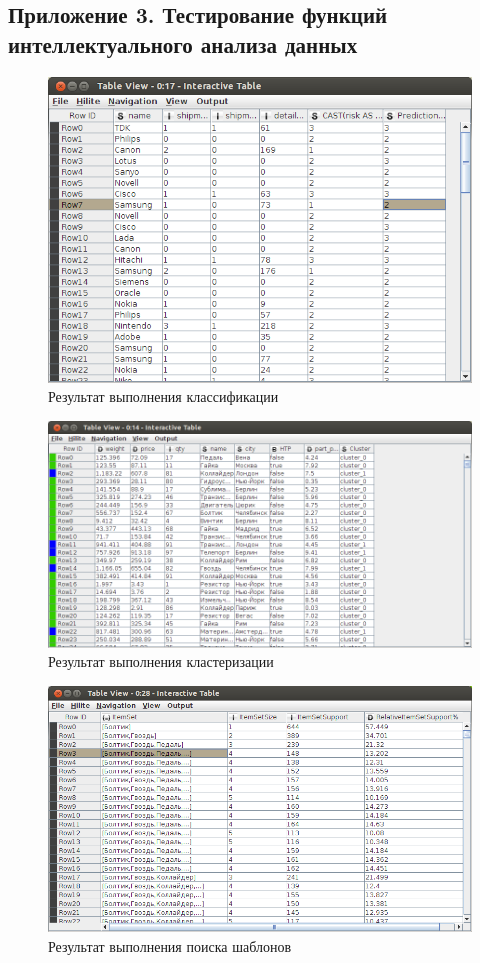 \newpage
\subsection{Приложение 3. Тестирование функций интеллектуального анализа данных}

\begin{figure}[h]
  \centering
  \includegraphics[scale=0.4]{classification.png}
  \caption{Результат выполнения классификации}
  \label{knime-classification}
\end{figure}

\begin{figure}[h]
  \centering
  \includegraphics[scale=0.4]{clusters.png}
  \caption{Результат выполнения кластеризации}
  \label{knime-clasterisation}
\end{figure}

\begin{figure}[h]
  \centering
  \includegraphics[scale=0.4]{freq_patterns.png}
  \caption{Результат выполнения поиска шаблонов}
  \label{knime-patterns}
\end{figure}

